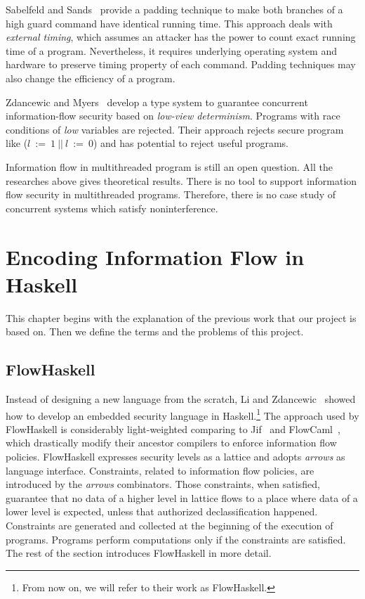 \documentclass{report}
\begin{document}
Sabelfeld and Sands~\cite{Sabelfeld:Sands:CSFW00} provide a padding
technique to make both branches of a high guard command have identical
running time. This approach deals with {\em external timing}, which 
assumes an attacker has the power to count exact running time of a 
program. Nevertheless, it requires underlying operating system 
and hardware to preserve timing property of each command. Padding techniques
may also change the efficiency of a program.

Zdancewic and Myers~\cite{Zdancewic:Myers:CSFW03} develop a type system to
guarantee concurrent information-flow security based 
on {\em low-view determinism}.
Programs with race conditions of {\it low} variables are rejected.
Their approach rejects secure program like ($l~:=~1~||~l~:=~0$) and
has potential to reject useful programs.

Information flow in multithreaded program is still an open question.
All the researches above gives theoretical results.
There is no tool to support information flow security in multithreaded
programs. Therefore, there is no case study of concurrent systems which 
satisfy noninterference.


\chapter{Encoding Information Flow in Haskell}

This chapter begins with the explanation of the previous work that our project
is based on.
Then we define the terms and the problems of this project.

\section{FlowHaskell}
Instead of designing a new language from the scratch, Li and 
Zdancewic~\cite{Li:Zdancewic:CSFW} showed how to develop an embedded security language 
in Haskell.\footnote{From now on, we will refer to their work as FlowHaskell.} 
The approach used by FlowHaskell is considerably light-weighted 
comparing to Jif~\cite{jif} and FlowCaml~\cite{FlowCaml}, which drastically modify their ancestor 
compilers to enforce information flow policies. 
FlowHaskell expresses security levels as a lattice and adopts {\em arrows} as language interface. 
Constraints, related to information flow policies, are introduced by the {\em arrows} combinators. 
Those constraints, when satisfied, guarantee that no data of a higher level in lattice flows 
to a place where data of a lower level is expected, unless that authorized declassification happened.
Constraints are generated and collected at the beginning of the execution of programs. 
Programs perform computations only if the constraints are satisfied.
The rest of the section introduces FlowHaskell in more detail.
\end{document}
